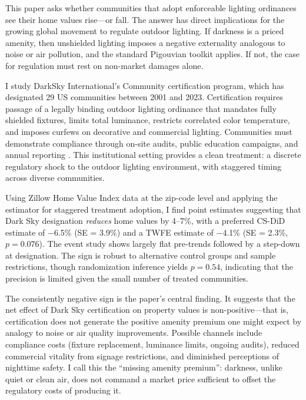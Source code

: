 \documentclass[12pt]{article}
\begin{document}
This paper asks whether communities that adopt enforceable lighting ordinances see their home values rise---or fall. The answer has direct implications for the growing global movement to regulate outdoor lighting. If darkness is a priced amenity, then unshielded lighting imposes a negative externality analogous to noise or air pollution, and the standard Pigouvian toolkit applies. If not, the case for regulation must rest on non-market damages alone.

I study DarkSky International's Community certification program, which has designated 29 US communities between 2001 and 2023. Certification requires passage of a legally binding outdoor lighting ordinance that mandates fully shielded fixtures, limits total luminance, restricts correlated color temperature, and imposes curfews on decorative and commercial lighting. Communities must demonstrate compliance through on-site audits, public education campaigns, and annual reporting \citep{darksky2023guidelines}. This institutional setting provides a clean treatment: a discrete regulatory shock to the outdoor lighting environment, with staggered timing across diverse communities.

Using Zillow Home Value Index data at the zip-code level and applying the \citet{callaway2021difference} estimator for staggered treatment adoption, I find point estimates suggesting that Dark Sky designation \textit{reduces} home values by 4--7\%, with a preferred CS-DiD estimate of $-$6.5\% (SE = 3.9\%) and a TWFE estimate of $-$4.1\% (SE = 2.3\%, $p = 0.076$). The event study shows largely flat pre-trends followed by a step-down at designation. The sign is robust to alternative control groups and sample restrictions, though randomization inference yields $p = 0.54$, indicating that the precision is limited given the small number of treated communities.

The consistently negative sign is the paper's central finding. It suggests that the net effect of Dark Sky certification on property values is non-positive---that is, certification does not generate the positive amenity premium one might expect by analogy to noise or air quality improvements. Possible channels include compliance costs (fixture replacement, luminance limits, ongoing audits), reduced commercial vitality from signage restrictions, and diminished perceptions of nighttime safety. I call this the ``missing amenity premium'': darkness, unlike quiet or clean air, does not command a market price sufficient to offset the regulatory costs of producing it.
\end{document}
